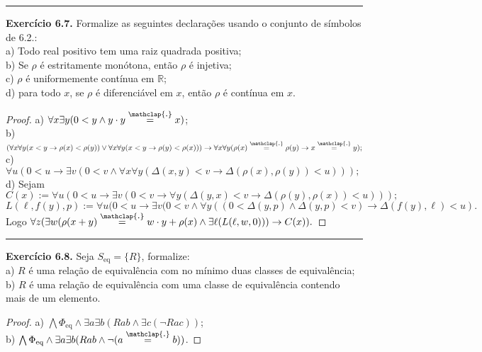 \documentclass[11pt]{article}
\newcommand{\mbb}[1]{\mathbb{#1}}
\newcommand\overtext[2]{\stackrel{\mathclap{\normalfont\mbox{#1}}}{#2}}
\begin{document}
\hrule

\begin{shaded}
\textbf{Exercício 6.7.} Formalize as seguintes declarações usando o conjunto de símbolos de 6.2.:\\
a) Todo real positivo tem uma raiz quadrada positiva;\\
b) Se $\rho$ é estritamente monótona, então $\rho$ é injetiva;\\
c) $\rho$ é uniformemente contínua em $\mbb{R}$;\\
d) para todo $x$, se $\rho$ é diferenciável em $x$, então $\rho$ é contínua em $x$.
\end{shaded}

\begin{proof}
    a) $\forall x\exists y(0<y\wedge y\cdot y\overtext{.}{=}x)$;\\
    b) $(\forall x\forall y(x<y\rightarrow\rho(x)<\rho(y))\vee\forall x\forall y(x<y\rightarrow\rho(y)<\rho(x)))\rightarrow\forall x\forall y(\rho(x)\overtext{.}{=}\rho(y)\rightarrow x\overtext{.}{=}y);$\\
    c) $\forall u(0<u\rightarrow\exists v(0<v\wedge\forall x\forall y(\Delta(x,y)<v\rightarrow\Delta(\rho(x),\rho(y))<u)));$\\
    d) Sejam $$C(x):=\forall u(0<u\rightarrow\exists v(0<v\rightarrow\forall y(\Delta(y,x)<v\rightarrow\Delta(\rho(y),\rho(x))<u)));$$
    $$L(\ell, f(y), p):=\forall u(0<u\rightarrow\exists v(0<v\wedge\forall y((0<\Delta(y,p)\wedge\Delta(y,p)<v)\rightarrow\Delta(f(y),\ell)<u).$$
    Logo $\forall z(\exists w(\rho(x+y)\overtext{.}{=}w\cdot y+\rho(x)\wedge\exists\ell(L(\ell,w,0)))\rightarrow C(x)).$
\end{proof}

\hrule

\begin{shaded}
\textbf{Exercício 6.8.} Seja $S_\text{eq}=\{R\}$, formalize:\\
a) $R$ é uma relação de equivalência com no mínimo duas classes de equivalência;\\
b) $R$ é uma relação de equivalência com uma classe de equivalência contendo mais de um elemento.
\end{shaded}

\begin{proof}
    a) $\bigwedge\Phi_\text{eq}\wedge\exists a\exists b(Rab\wedge\exists c(\neg Rac))$;\\
    b) $\bigwedge\Phi_\text{eq}\wedge\exists a\exists b(Rab\wedge\neg(a\overtext{.}{=}b))$.
\end{proof}
\end{document}
